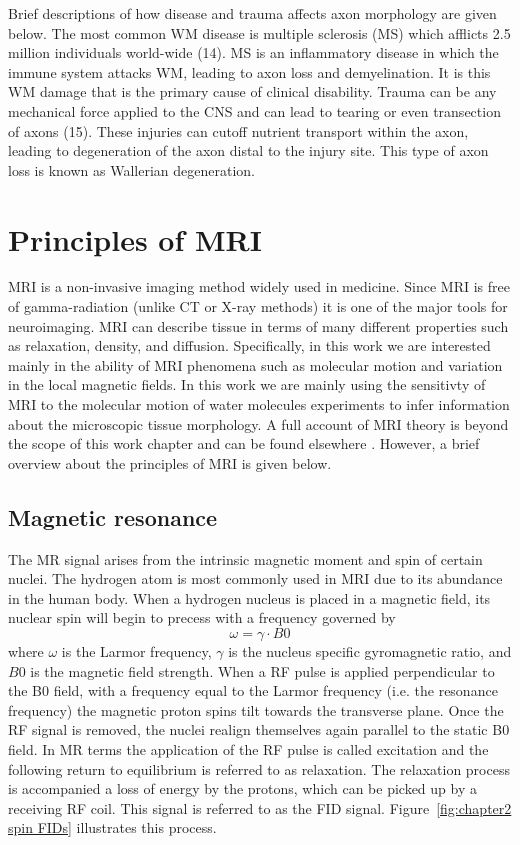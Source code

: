 Brief descriptions of how disease and trauma affects axon morphology are given below. The most common WM disease is multiple sclerosis (MS) which afflicts 2.5 million individuals world-wide (14). MS is an inflammatory disease in which the immune system attacks WM, leading to axon loss and demyelination. It is this WM damage that is the primary cause of clinical disability. Trauma can be any mechanical force applied to the CNS and can lead to tearing or even transection of axons (15). These injuries can cutoff nutrient transport within the axon, leading to degeneration of the axon distal to the injury site. This type of axon loss is known as Wallerian degeneration.

\section{Principles of MRI}
\Gls{MRI} is a non-invasive imaging method widely used in medicine. Since \gls{MRI} is free of gamma-radiation (unlike CT or X-ray methods) it is one of the major tools for neuroimaging. \Gls{MRI} can describe tissue in terms of many different properties such as relaxation, density, and diffusion. Specifically, in this work we are interested mainly in the ability of MRI phenomena such as molecular motion and variation in the local magnetic fields. In this work we are mainly using the sensitivty of MRI to the molecular motion of water molecules experiments to infer information about the microscopic tissue morphology. A full account of MRI theory is beyond the scope of this work chapter and can be found elsewhere \citep{MRI Books}. However, a brief overview about the principles of \gls{MRI} is given below.
\subsection*{Magnetic resonance}
The MR signal arises from the intrinsic magnetic moment and spin of certain nuclei. The hydrogen atom is most commonly used in MRI due to its abundance in the
human body. When a hydrogen nucleus is placed in a magnetic field, its nuclear spin will begin to precess with a frequency governed by
\begin{equation}
\omega =\gamma \cdot B0 
\end{equation}
where $\omega$ is the Larmor frequency, $\gamma$ is the nucleus specific gyromagnetic ratio, and $B0$ is the magnetic field strength. When a \gls{RF} pulse is applied perpendicular to the B0 field, with a frequency equal to the Larmor frequency (i.e. the resonance frequency) the magnetic proton spins tilt towards the transverse plane. Once the RF signal is removed, the nuclei realign themselves again parallel to the static B0 field. In MR terms the application of the \gls{RF} pulse is called excitation and the following return to equilibrium is referred to as relaxation. The relaxation process is accompanied a loss of energy by the protons, which can be picked up by a receiving RF coil. This signal is referred to as the \gls{FID} signal. Figure~\ref{fig:chapter2 spin FIDs} illustrates this process. 

